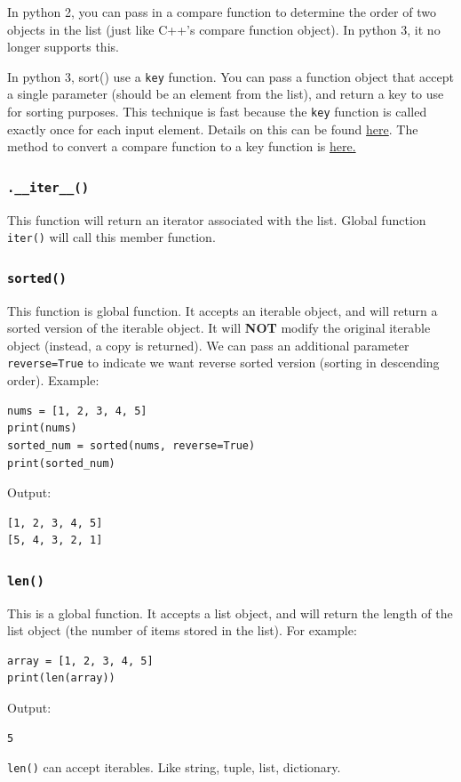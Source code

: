 \documentclass[12pt]{book}
\begin{document}
In python 2, you can pass in a compare function to determine the order of two objects in the list (just like C++'s compare function object). In python 3, it no longer supports this.

In python 3, sort() use a \texttt{key} function. You can pass a function object that accept a single parameter (should be an element from the list), and return a key to use for sorting purposes. This technique is fast because the \texttt{key} function is called exactly once for each input element. Details on this can be found \href{https://docs.python.org/3/howto/sorting.html\#key-functions}{here}. The method to convert a compare function to a key function is \href{https://docs.python.org/3/howto/sorting.html\#the-old-way-using-the-cmp-parameter}{here.
}
\subsubsection{\texttt{.\_\_iter\_\_()}}
\label{sec:org6cae5ae}
This function will return an iterator associated with the list. Global function \texttt{iter()} will call this member function.
\subsubsection{\texttt{sorted()}}
\label{sec:org94f8dd6}
This function is global function. It accepts an iterable object, and will return a sorted version of the iterable object. It will \textbf{NOT} modify the original iterable object (instead, a copy is returned). We can pass an additional parameter \texttt{reverse=True} to indicate we want reverse sorted version (sorting in descending order). Example:
\begin{verbatim}
nums = [1, 2, 3, 4, 5]
print(nums)
sorted_num = sorted(nums, reverse=True)
print(sorted_num)
\end{verbatim}
Output:
\begin{verbatim}
[1, 2, 3, 4, 5]
[5, 4, 3, 2, 1]
\end{verbatim}

\subsubsection{\texttt{len()}}
\label{sec:org9381673}
This is a global function. It accepts a list object, and will return the length of the list object (the number of items stored in the list). For example:
\begin{verbatim}
array = [1, 2, 3, 4, 5]
print(len(array))
\end{verbatim}
Output:
\begin{verbatim}
5
\end{verbatim}
\texttt{len()} can accept iterables. Like string, tuple, list, dictionary.
\end{document}

